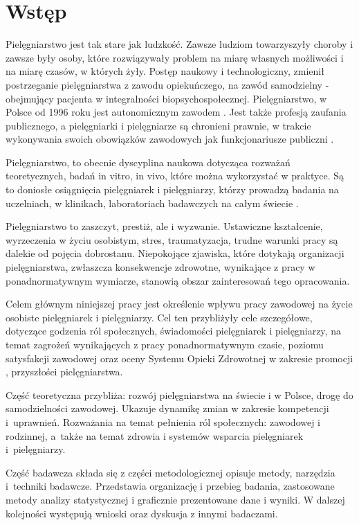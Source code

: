 \documentclass[a4paper,12pt,twoside,openright]{mwrep}
\begin{document}

\chapter*{Wstęp}

Pielęgniarstwo jest tak stare jak ludzkość. Zawsze ludziom towarzyszyły choroby i zawsze były osoby, które rozwiązywały problem na miarę własnych możliwości i na miarę czasów, w których żyły. Postęp naukowy i technologiczny, zmienił postrzeganie pielęgniarstwa z zawodu opiekuńczego, na zawód samodzielny - obejmujący pacjenta w integralności biopsychospołecznej. Pielęgniarstwo, w Polsce od 1996 roku jest autonomicznym zawodem \cite{konst97art17}. Jest także profesją zaufania publicznego, a pielęgniarki i pielęgniarze są chronieni prawnie, w trakcie wykonywania swoich obowiązków zawodowych jak funkcjonariusze publiczni \cite{art4uozp}.

Pielęgniarstwo, to obecnie dyscyplina naukowa dotycząca rozważań teoretycznych, badań in vitro, in vivo, które można wykorzystać w praktyce. Są to doniosłe osiągnięcia pielęgniarek i pielęgniarzy, którzy prowadzą badania na uczelniach, w klinikach, laboratoriach badawczych na całym świecie \cite{nursingresearch}.

Pielęgniarstwo to zaszczyt, prestiż, ale i wyzwanie. Ustawiczne kształcenie, wyrzeczenia w życiu osobistym, stres, traumatyzacja, trudne warunki pracy są dalekie od pojęcia dobrostanu.  Niepokojące zjawiska, które dotykają organizacji pielęgniarstwa, zwłaszcza konsekwencje zdrowotne, wynikające z pracy w ponadnormatywnym wymiarze, stanowią obszar zainteresowań tego opracowania.

Celem głównym niniejszej pracy jest określenie wpływu pracy zawodowej na życie osobiste pielęgniarek i pielęgniarzy. Cel ten przybliżyły cele szczegółowe, dotyczące godzenia ról społecznych, świadomości pielęgniarek i pielęgniarzy, na temat zagrożeń wynikających z pracy ponadnormatywnym czasie, poziomu satysfakcji zawodowej oraz oceny Systemu Opieki Zdrowotnej w zakresie promocji , przyszłości pielęgniarstwa.

Część teoretyczna przybliża: rozwój pielęgniarstwa na świecie i w Polsce, drogę do samodzielności zawodowej. Ukazuje dynamikę zmian w zakresie kompetencji i~uprawnień. Rozważania na temat pełnienia ról społecznych: zawodowej i rodzinnej, a~także na temat zdrowia i systemów wsparcia pielęgniarek i~pielęgniarzy. 

Część badawcza składa się z części metodologicznej opisuje metody, narzędzia i~techniki badawcze. Przedstawia organizację i przebieg badania, zastosowane metody analizy statystycznej i graficznie prezentowane dane i wyniki. W dalszej kolejności występują wnioski oraz dyskusja z innymi badaczami.
\end{document}
